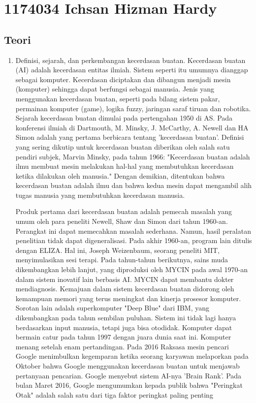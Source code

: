 \section{1174034 Ichsan Hizman Hardy}
\subsection{Teori}
\begin{enumerate}
\item Definisi, sejarah, dan perkembangan kecerdasan buatan.
\subitem Kecerdasan buatan (AI) adalah kecerdasan entitas ilmiah. Sistem seperti itu umumnya dianggap sebagai komputer. Kecerdasan diciptakan dan dibangun menjadi mesin (komputer) sehingga dapat berfungsi sebagai manusia. Jenis yang menggunakan kecerdasan buatan, seperti pada bilang sistem pakar, permainan komputer (game), logika fuzzy, jaringan saraf tiruan dan robotika.
\subitem Sejarah kecerdasan buatan dimulai pada pertengahan 1950 di AS. Pada konferensi ilmiah di Dartmouth, M. Minsky, J. McCarthy, A. Newell dan HA Simon adalah yang pertama berbicara tentang 'kecerdasan buatan'. Definisi yang sering dikutip untuk kecerdasan buatan diberikan oleh salah satu pendiri subjek, Marvin Minsky, pada tahun 1966: "Kecerdasan buatan adalah ilmu membuat mesin melakukan hal-hal yang membutuhkan kecerdasan ketika dilakukan oleh manusia." Dengan demikian, ditentukan bahwa kecerdasan buatan adalah ilmu dan bahwa kedua mesin dapat mengambil alih tugas manusia yang membutuhkan kecerdasan manusia.
\par Produk pertama dari kecerdasan buatan adalah pemecah masalah yang umum oleh para peneliti Newell, Shaw dan Simon dari tahun 1960-an. Perangkat ini dapat memecahkan masalah sederhana. Namun, hasil peralatan penelitian tidak dapat digeneralisasi. Pada akhir 1960-an, program lain ditulis dengan ELIZA. Hal ini, Joseph Weizenbaum, seorang peneliti MIT, menyimulasikan sesi terapi.
Pada tahun-tahun berikutnya, sains muda dikembangkan lebih lanjut, yang diproduksi oleh MYCIN pada awal 1970-an dalam sistem inovatif lain berbasis AI. MYCIN dapat membantu dokter mendiagnosis.
Kemajuan dalam sistem kecerdasan buatan didorong oleh kemampuan memori yang terus meningkat dan kinerja prosesor komputer. Sorotan lain adalah superkomputer "Deep Blue" dari IBM, yang dikembangkan pada tahun sembilan puluhan. Sistem ini tidak lagi hanya berdasarkan input manusia, tetapi juga bisa otodidak. Komputer dapat bermain catur pada tahun 1997 dengan juara dunia saat ini. Komputer menang setelah enam pertandingan.
Pada 2016 Raksasa mesin pencari Google menimbulkan kegemparan ketika seorang karyawan melaporkan pada Oktober bahwa Google menggunakan kecerdasan buatan untuk menjawab pertanyaan pencarian. Google menyebut sistem AI-nya 'Brain Rank'. Pada bulan Maret 2016, Google mengumumkan kepada publik bahwa "Peringkat Otak" adalah salah satu dari tiga faktor peringkat paling penting

\end{enumerate}
